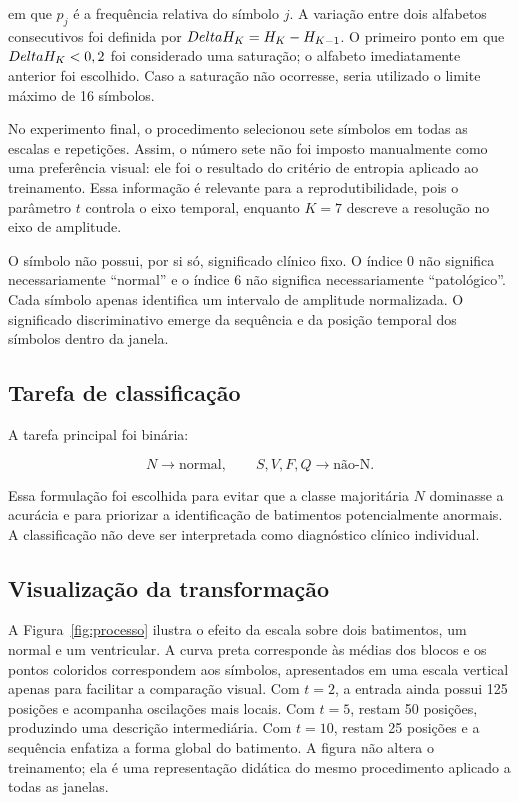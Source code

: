 \documentclass[12pt,a4paper]{article}
\begin{document}
em que $p_j$ é a frequência relativa do símbolo $j$. A variação entre dois alfabetos consecutivos foi definida por $\\Delta H_K=H_K-H_{K-1}$. O primeiro ponto em que $\\Delta H_K<0,2$ foi considerado uma saturação; o alfabeto imediatamente anterior foi escolhido. Caso a saturação não ocorresse, seria utilizado o limite máximo de 16 símbolos.

No experimento final, o procedimento selecionou sete símbolos em todas as escalas e repetições. Assim, o número sete não foi imposto manualmente como uma preferência visual: ele foi o resultado do critério de entropia aplicado ao treinamento. Essa informação é relevante para a reprodutibilidade, pois o parâmetro $t$ controla o eixo temporal, enquanto $K=7$ descreve a resolução no eixo de amplitude.

O símbolo não possui, por si só, significado clínico fixo. O índice 0 não significa necessariamente ``normal'' e o índice 6 não significa necessariamente ``patológico''. Cada símbolo apenas identifica um intervalo de amplitude normalizada. O significado discriminativo emerge da sequência e da posição temporal dos símbolos dentro da janela.

\subsection{Tarefa de classificação}

A tarefa principal foi binária:

\begin{equation}
N \rightarrow \text{normal}, \qquad S,V,F,Q \rightarrow \text{não-N}.
\end{equation}

Essa formulação foi escolhida para evitar que a classe majoritária $N$ dominasse a acurácia e para priorizar a identificação de batimentos potencialmente anormais. A classificação não deve ser interpretada como diagnóstico clínico individual.

\subsection{Visualização da transformação}

A Figura~\ref{fig:processo} ilustra o efeito da escala sobre dois batimentos, um normal e um ventricular. A curva preta corresponde às médias dos blocos e os pontos coloridos correspondem aos símbolos, apresentados em uma escala vertical apenas para facilitar a comparação visual. Com $t=2$, a entrada ainda possui 125 posições e acompanha oscilações mais locais. Com $t=5$, restam 50 posições, produzindo uma descrição intermediária. Com $t=10$, restam 25 posições e a sequência enfatiza a forma global do batimento. A figura não altera o treinamento; ela é uma representação didática do mesmo procedimento aplicado a todas as janelas.
\end{document}
